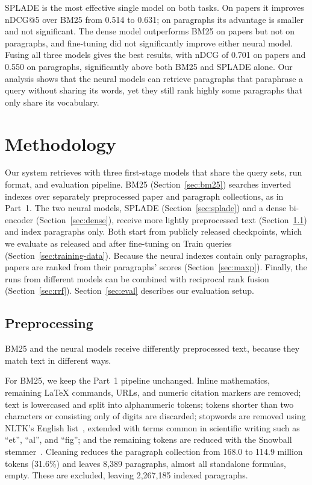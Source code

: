 \documentclass[sigconf,nonacm]{acmart}
\begin{document}
SPLADE is the most effective single model on both tasks. On papers it improves nDCG@5 
over BM25 from 0.514 to 0.631; on paragraphs its advantage is smaller and not significant. 
The dense model outperforms BM25 on papers but not on paragraphs, and fine-tuning did 
not significantly improve either neural model. Fusing all three models gives the best 
results, with nDCG of 0.701 on papers and 0.550 on paragraphs, significantly above both 
BM25 and SPLADE alone. Our analysis shows that the neural models can retrieve paragraphs 
that paraphrase a query without sharing its words, yet they still rank highly some paragraphs 
that only share its vocabulary.

\section{Methodology}
\label{sec:method}
Our system retrieves with three first-stage models that share the query 
sets, run format, and evaluation pipeline. BM25 (Section~\ref{sec:bm25}) 
searches inverted indexes over separately preprocessed paper and paragraph 
collections, as in Part~1. The two neural models, SPLADE (Section~\ref{sec:splade}) 
and a dense bi-encoder (Section~\ref{sec:dense}), receive more lightly preprocessed 
text (Section~\ref{sec:preprocessing}) and index paragraphs only. Both start from 
publicly released checkpoints, which we evaluate as released and after fine-tuning 
on Train queries (Section~\ref{sec:training-data}). Because the neural indexes contain 
only paragraphs, papers are ranked from their paragraphs' scores (Section~\ref{sec:maxp}). 
Finally, the runs from different models can be combined with reciprocal rank fusion 
(Section~\ref{sec:rrf}). Section~\ref{sec:eval} describes our evaluation setup.

\subsection{Preprocessing}
\label{sec:preprocessing}
BM25 and the neural models receive differently preprocessed text, because they 
match text in different ways.

For BM25, we keep the Part~1 pipeline unchanged. Inline mathematics, remaining 
\LaTeX{} commands, URLs, and numeric citation markers are removed; text is 
lowercased and split into alphanumeric tokens; tokens shorter than two characters 
or consisting only of digits are discarded; stopwords are removed using NLTK's English 
list~\cite{bird2009nltk}, extended with terms common in scientific writing such as ``et'', 
``al'', and ``fig''; and the remaining tokens are reduced with the Snowball 
stemmer~\cite{porter2001snowball}. Cleaning reduces the paragraph collection from 
168.0 to 114.9 million tokens (31.6\%) and leaves 8,389 paragraphs, almost all 
standalone formulas, empty. These are excluded, leaving 2,267,185 indexed paragraphs. 
\end{document}
